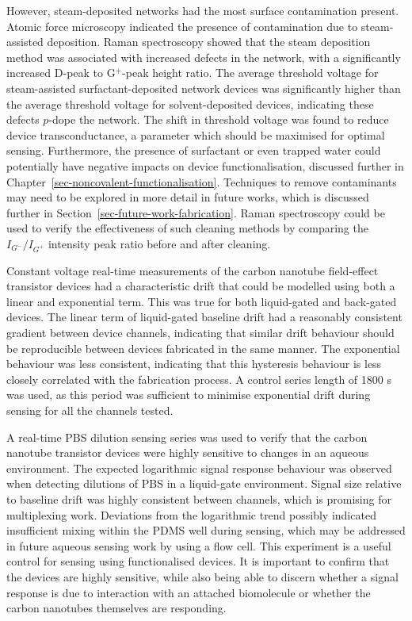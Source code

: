 \documentclass[
  a4paper,
]{scrbook}
\begin{document}
However, steam-deposited networks had the most surface contamination
present. Atomic force microscopy indicated the presence of contamination
due to steam-assisted deposition. Raman spectroscopy showed that the
steam deposition method was associated with increased defects in the
network, with a significantly increased D-peak to G\(^+\)-peak height
ratio. The average threshold voltage for steam-assisted
surfactant-deposited network devices was significantly higher than the
average threshold voltage for solvent-deposited devices, indicating
these defects \(p\)-dope the network. The shift in threshold voltage was
found to reduce device transconductance, a parameter which should be
maximised for optimal sensing. Furthermore, the presence of surfactant
or even trapped water could potentially have negative impacts on device
functionalisation, discussed further in
Chapter~\ref{sec-noncovalent-functionalisation}. Techniques to remove
contaminants may need to be explored in more detail in future works,
which is discussed further in Section~\ref{sec-future-work-fabrication}.
Raman spectroscopy could be used to verify the effectiveness of such
cleaning methods by comparing the \(I_{G^-}/I_{G^+}\) intensity peak
ratio before and after cleaning.

Constant voltage real-time measurements of the carbon nanotube
field-effect transistor devices had a characteristic drift that could be
modelled using both a linear and exponential term. This was true for
both liquid-gated and back-gated devices. The linear term of
liquid-gated baseline drift had a reasonably consistent gradient between
device channels, indicating that similar drift behaviour should be
reproducible between devices fabricated in the same manner. The
exponential behaviour was less consistent, indicating that this
hysteresis behaviour is less closely correlated with the fabrication
process. A control series length of 1800 s was used, as this period was
sufficient to minimise exponential drift during sensing for all the
channels tested.

A real-time PBS dilution sensing series was used to verify that the
carbon nanotube transistor devices were highly sensitive to changes in
an aqueous environment. The expected logarithmic signal response
behaviour was observed when detecting dilutions of PBS in a liquid-gate
environment. Signal size relative to baseline drift was highly
consistent between channels, which is promising for multiplexing work.
Deviations from the logarithmic trend possibly indicated insufficient
mixing within the PDMS well during sensing, which may be addressed in
future aqueous sensing work by using a flow cell. This experiment is a
useful control for sensing using functionalised devices. It is important
to confirm that the devices are highly sensitive, while also being able
to discern whether a signal response is due to interaction with an
attached biomolecule or whether the carbon nanotubes themselves are
responding.
\end{document}
